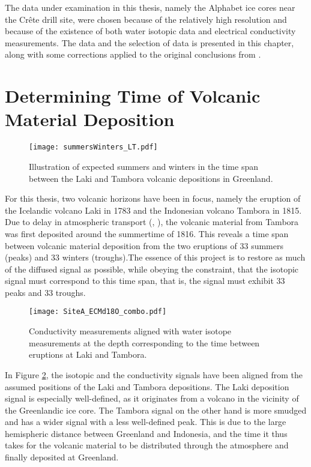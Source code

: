 \documentclass[../../CompleteThesis2/Complete_2ndDraft]{subfiles}
\begin{document}
The data under examination in this thesis, namely the Alphabet ice cores near the Crête drill site, were chosen because of the relatively high resolution and because of the existence of both water isotopic data and electrical conductivity measurements. The data and the selection of data is presented in this chapter, along with some corrections applied to the original conclusions from \cite[Clausen \& Hammer, 1988]{ClausenHammer1988}.
\minitoc

\section[Volcanic Horizons][Volcanic Horizons]{Determining Time of Volcanic Material Deposition}
\label{Sec:Data_VolcanicHorizons}

\begin{figure}[h]
	\centering
	\texttt{[image: summersWinters\_LT.pdf]}
	\caption[Summers and Winters between Laki and Tambora]{\small Illustration of expected summers and winters in the time span between the Laki and Tambora volcanic depositions in Greenland.}
	\label{Fig:SummersAndWintersLT}
\end{figure}

For this thesis, two volcanic horizons have been in focus, namely the eruption of the Icelandic volcano Laki in 1783 and the Indonesian volcano Tambora in 1815. Due to delay in atmospheric transport (\cite[Wei et al., 2008]{Wei2008}, \cite[Cole-Dai et al, 2009]{Dai2009}), the volcanic material from Tambora was first deposited around the summertime of 1816. This reveals a time span between volcanic material deposition from the two eruptions of 33 summers (peaks) and 33 winters (troughs).The essence of this project is to restore as much of the diffused signal as possible, while obeying the constraint, that the isotopic signal must correspond to this time span, that is, the signal must exhibit 33 peaks and 33 troughs.


\begin{figure}[h]
	\centering
	\texttt{[image: SiteA\_ECMd18O\_combo.pdf]}
	\caption[ECM and $\delta^{18}$O data between Laki and Tambora, Site A]{\small Conductivity measurements aligned with water isotope measurements at the depth corresponding to the time between eruptions at Laki and Tambora.}
	\label{Fig:DATA_SiteA_ECM_d18O_combo}
\end{figure}
In Figure \ref{Fig:DATA_SiteA_ECM_d18O_combo}, the isotopic and the conductivity signals have been aligned from the assumed positions of the Laki and Tambora depositions. The Laki deposition signal is especially well-defined, as it originates from a volcano in the vicinity of the Greenlandic ice core. The Tambora signal on the other hand is more smudged and has a wider signal with a less well-defined peak. This is due to the large hemispheric distance between Greenland and Indonesia, and the time it thus takes for the volcanic material to be distributed through the atmosphere and finally deposited at Greenland.
\end{document}
